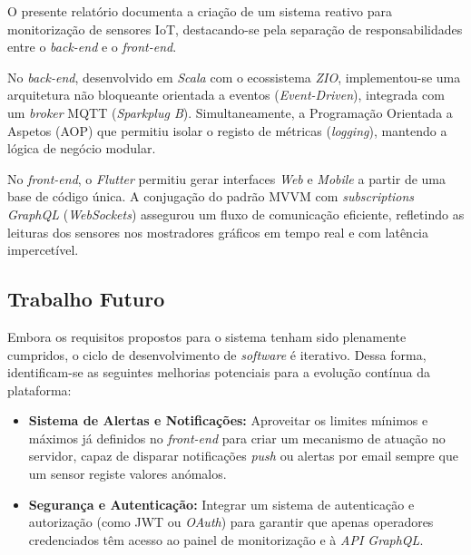 \documentclass[12pt,a4paper,titlepage]{article}
\begin{document}
O presente relatório documenta a criação de um sistema reativo para monitorização de sensores IoT, destacando-se pela separação de responsabilidades entre o \textit{back-end} e o \textit{front-end}.

No \textit{back-end}, desenvolvido em \textit{Scala} com o ecossistema \textit{ZIO}, implementou-se uma arquitetura não bloqueante orientada a eventos (\textit{Event-Driven}), integrada com um \textit{broker} MQTT (\textit{Sparkplug B}). Simultaneamente, a Programação Orientada a Aspetos (AOP) que permitiu isolar o registo de métricas (\textit{logging}), mantendo a lógica de negócio modular.

No \textit{front-end}, o \textit{Flutter} permitiu gerar interfaces \textit{Web} e \textit{Mobile} a partir de uma base de código única. A conjugação do padrão MVVM com \textit{subscriptions GraphQL} (\textit{WebSockets}) assegurou um fluxo de comunicação eficiente, refletindo as leituras dos sensores nos mostradores gráficos em tempo real e com latência impercetível.

\subsection{Trabalho Futuro}
Embora os requisitos propostos para o sistema tenham sido plenamente cumpridos, o ciclo de desenvolvimento de \textit{software} é iterativo. Dessa forma, identificam-se as seguintes melhorias potenciais para a evolução contínua da plataforma:

\begin{itemize}
	\item \textbf{Sistema de Alertas e Notificações:} Aproveitar os limites mínimos e máximos já definidos no \textit{front-end} para criar um mecanismo de atuação no servidor, capaz de disparar notificações \textit{push} ou alertas por email sempre que um sensor registe valores anómalos.
	
	\item \textbf{Segurança e Autenticação:} Integrar um sistema de autenticação e autorização (como JWT ou \textit{OAuth}) para garantir que apenas operadores credenciados têm acesso ao painel de monitorização e à \textit{API GraphQL}.
\end{itemize}
\end{document}

